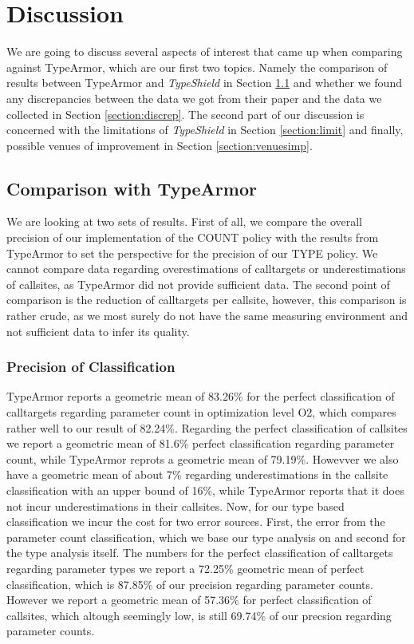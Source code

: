 \chapter{Discussion}
\label{chapter:Discussion}

We are going to discuss several aspects of interest that came up when comparing against TypeArmor, which are our first two topics. Namely the comparison of results between TypeArmor and \textit{TypeShield} in Section \ref{section:comptype} and whether we found any discrepancies between the data we got from their paper and the data we collected in Section \ref{section:discrep}. The second part of our discussion is concerned with the limitations of \textit{TypeShield} in Section \ref{section:limit} and finally, possible venues of improvement in Section \ref{section:venuesimp}.

\section{Comparison with TypeArmor}
\label{section:comptype}
We are looking at two sets of results. First of all, we compare the overall precision of our implementation of the COUNT policy with the results from TypeArmor to set the perspective for the precision of our TYPE policy. We cannot compare data regarding overestimations of calltargets or underestimations of callsites, as TypeArmor did not provide sufficient data. The second point of comparison is the reduction of calltargets per callsite, however, this comparison is rather crude, as we most surely do not have the same measuring environment and not sufficient data to infer its quality.

\subsection{Precision of Classification}
TypeArmor reports a geometric mean of 83.26\% for the perfect classification of calltargets regarding parameter count in optimization level O2, which compares rather well to our result of 82.24\%. Regarding the perfect classification of callsites we report a geometric mean of 81.6\% perfect classification regarding parameter count, while TypeArmor reprots a geometric mean of 79.19\%. Howevver we also have a geometric mean of about 7\% regarding underestimations in the callsite classification with an upper bound of 16\%, while TypeArmor reports that it does not incur underestimations in their callsites.
Now, for our type based classification we incur the cost for two error sources. First, the error from the parameter count classification, which we base our type analysis on and second for the type analysis itself. The numbers for the perfect classification of calltargets regarding parameter types we report a 72.25\% geometric mean of perfect classification, which is 87.85\% of our precision regarding parameter counts. However we report a geometric mean of 57.36\%
for perfect classification of callsites, which altough seemingly low, is still 69.74\% of our precsion regarding parameter counts.

